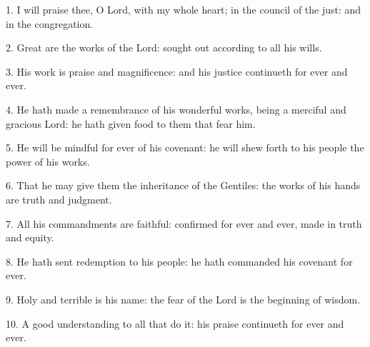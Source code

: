  1. I will praise thee, O Lord, with my whole heart; in the council of the just: and in the congregation.
 
 2. Great are the works of the Lord: sought out according to all his wills.
 
 3. His work is praise and magnificence: and his justice continueth for ever and ever.
 
 4.  He hath made a remembrance of his wonderful works, being a merciful and gracious Lord: he hath given food to them that fear him. 	
 
 5. He will be mindful for ever of his covenant: he will shew forth to his people the power of his works.
 
 6. That he may give them the inheritance of the Gentiles: the works of his hands are truth and judgment.
 
 7. All his commandments are faithful: confirmed for ever and ever, made in truth and equity.
 
 8. He hath sent redemption to his people: he hath commanded his covenant for ever.
 
 9. Holy and terrible is his name: the fear of the Lord is the beginning of wisdom.
 
 10. A good understanding to all that do it: his praise continueth for ever and ever. 